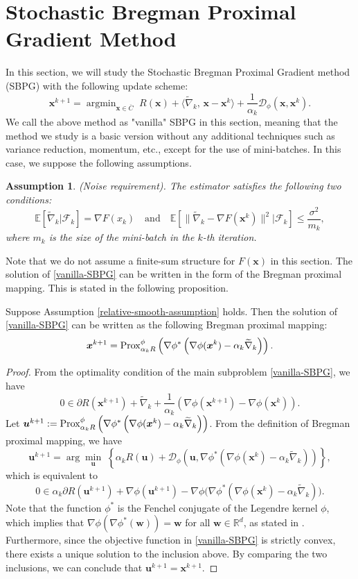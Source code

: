 \documentclass[twoside,11pt]{article}
\newcommand{\R}{\mathbb R}
\newcommand{\E}{\mathbb{E}}
\newcommand{\cD}{\mathcal D}
\newcommand{\cF}{\mathcal F}
\newcommand{\wtnabla}{\widetilde\nabla}
\DeclareMathOperator*{\argmin}{argmin}
\def\inprod#1#2{\langle#1,\,#2\rangle}
\newtheorem{assumption}{Assumption}%
\def\vu{{\bm{u}}}
\def\vw{{\bm{w}}}
\def\vx{{\bm{x}}}
\begin{document}
\section{Stochastic Bregman Proximal Gradient Method}\label{section-vanilla-SBPG}
In this section, we will study the Stochastic Bregman Proximal Gradient method (SBPG) with the following update scheme:
\begin{equation}
{\vx^{k+1}}=\argmin_{\vx\in\overline{C}}\;R(\vx)+\inprod{\widetilde\nabla_k}{\vx-{\vx^k}}+\frac{1}{\alpha_k}\cD_\phi(\vx,{\vx^k}).
\label{vanilla-SBPG}
\end{equation}
We call {the above method as} "vanilla" SBPG in this section, meaning that the method we study is a basic version without any additional techniques such as variance reduction, momentum, etc., except for the use of mini-batches. In this case, we suppose the following assumptions.
\begin{assumption}\label{variance-assumption}
(Noise requirement).
The estimator satisfies the following two conditions:
$$\E[\widetilde{\nabla}_k|\cF_k]=\nabla F(x_k) \quad \text{and}\quad 
\mathbb E[\|\widetilde\nabla_k-\nabla F({\vx^k})\|^2|\cF_k]\leq\frac{\sigma^2}{m_k},$$ where $m_k$ is the size of the mini-batch in the $k$-th iteration.    
\end{assumption}
 {Note} that we do not assume a finite-sum structure for $F(\vx)$ in this section. The solution of \eqref{vanilla-SBPG} can be written in the form of the Bregman proximal mapping. This is stated in the following proposition. 
 \begin{proposition} 
  \label{subprob-closed-form-sol} 
 Suppose Assumption \ref{relative-smooth-assumption} holds. Then the solution of \eqref{vanilla-SBPG} can be written as the following Bregman proximal mapping:
 \[
 {\vx^{k+1}}={\rm Prox}^\phi_{\alpha_k R}\left(\nabla\phi^*\left(\nabla\phi({\vx^k})-\alpha_k\widetilde\nabla_k\right)\right).
 \]
 \end{proposition}
 \begin{proof}
From the optimality condition of the main subproblem \eqref{vanilla-SBPG}, we have
 \[
 0\in\partial R({\vx^{k+1}})+\wtnabla_k+\frac{1}{\alpha_k}\left(\nabla\phi({\vx^{k+1}})-\nabla\phi({\vx^k})\right).
 \]
Let $\vu^{k+1}:={\rm Prox}^\phi_{\alpha_k R}\left(\nabla\phi^*\left(\nabla\phi({\vx^k})-\alpha_k\widetilde\nabla_k\right)\right)$. From the definition of Bregman proximal mapping, we have
\[
\vu^{k+1}=\arg\min_\vu\;\left\{\alpha_kR(\vu)+{\cD_\phi}\left(\vu,\nabla\phi^*\left(\nabla\phi({\vx^k})-\alpha_k\widetilde\nabla_k\right)\right)\right\},
\]
which is equivalent to
\[
0\in\alpha_k\partial R(\vu^{k+1})+\nabla\phi(\vu^{k+1})-\nabla\phi\big(\nabla\phi^*(\nabla\phi({\vx^k})-\alpha_k\wtnabla_k)\big).
\]
Note that the function $\phi^*$ is the Fenchel conjugate of the Legendre kernel $\phi$, which implies that $\nabla\phi(\nabla\phi^*(\vw))=\vw$ for all $\vw\in\R^d$, as stated in \cite[Corollary 13.3.1, Theorem 26.5]{rockafellar1997convex}. Furthermore, since the objective function in \eqref{vanilla-SBPG} is strictly convex, there exists a unique solution to the inclusion above. By comparing the two inclusions, we can conclude that $\vu^{k+1}={\vx^{k+1}}$.
 \end{proof}
\end{document}
